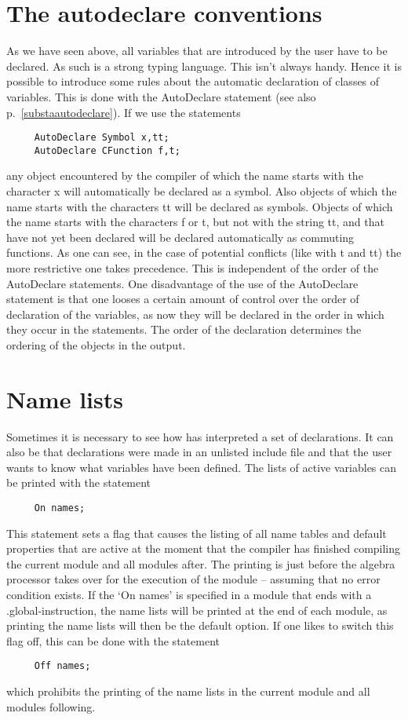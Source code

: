 \section{The autodeclare conventions}

As we have seen above, all variables that are introduced by the user have 
to be declared. As such {\FORM} is a strong typing 
language. This isn't always handy. Hence it is possible to introduce some 
rules about the automatic declaration of classes of variables. This is done 
with the AutoDeclare statement (see also 
p.~\ref{substaautodeclare}). If we use the statements
\begin{verbatim}
     AutoDeclare Symbol x,tt;
     AutoDeclare CFunction f,t;
\end{verbatim}
any object encountered by the compiler of which the name starts with the 
character x will automatically be declared as a symbol. Also objects of 
which the name starts with the characters tt will be declared as symbols. 
Objects of which the name starts with the characters f or t, but not with 
the string tt, and that have not yet been declared will be declared 
automatically as commuting functions. As one can see, in the case of 
potential conflicts (like with t and tt) the more 
restrictive one takes precedence. This is independent of the order of the 
AutoDeclare statements. One disadvantage of the use of the AutoDeclare 
statement is that one looses a certain amount of control over the order of 
declaration of the variables, as now they will be declared in the order in 
which they occur in the statements. The order of the declaration determines 
the ordering of the objects in the output.

\section{Name lists}

\label{sect-namelists}
Sometimes it is necessary to see how {\FORM} has interpreted a set
of declarations. It can also be that declarations were made in an unlisted 
include file and that the user wants to know what variables have been 
defined. The lists of active variables 
can be printed with the statement
\begin{verbatim}
     On names;
\end{verbatim}
This statement sets a flag that causes the listing of all name tables and 
default properties that are active at the moment that the compiler has 
finished compiling the current module and all modules after. The printing 
is just before the algebra processor takes over for the execution of the 
module -- assuming that no error condition exists. If the `On names' is 
specified in a module that ends with a .global-instruction, the name lists 
will be printed at the end of each module, as printing the name lists will 
then be the default option. If one likes to switch this flag off, this can 
be done with the statement
\begin{verbatim}
     Off names;
\end{verbatim}
which prohibits the printing of the name lists in the current module and 
all modules following.

